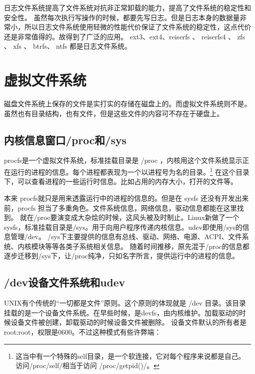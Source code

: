 日志文件系统提高了文件系统对抗非正常卸载的能力，提高了文件系统的稳定性和安全性。
虽然每次执行写操作的时候，都要先写日志。但是日志本身的数据量非常小，所以日志文件系统使用轻微的性能代价保证了文件系统的稳定性，这点代价还是非常值得的。故得到了广泛的应用。
ext3、ext4、reiserfs 、 reiserfs4 、 zfs 、 xfs 、 btrfs、 ntfs 都是日志文件系统。

\section{虚拟文件系统}

磁盘文件系统上保存的文件是实打实的存储在磁盘上的。而虚拟文件系统则不是。虽然也有目录结构，也有文件，但是这些文件的内容可不存在于硬盘上。


\subsection{内核信息窗口/proc和/sys}

procfs是一个虚拟文件系统，标准挂载目录是 /proc ，内核用这个文件系统显示正在运行的进程的信息。每个进程都表现为一个以进程号为名的目录。\footnote{ 这当中有一个特殊的self目录，是一个软连接，它对每个程序来说都是自己。访问/proc/self/相当于访问 /proc/getpid()/。}
在这个目录下，可以查看进程的一些运行时信息。比如占用的内存大小，打开的文件等。

本来 procfs就只是用来透露运行中的进程的信息的。但是在 sysfs 还没有开发出来前，procfs 担当了多重角色。文件系统信息，网络信息，驱动信息都能在这里找到。
就在/proc要演变成大杂烩的时候，这风头被及时制止。Linux新做了一个sysfs，标准挂载目录是/sys。用于向用户程序传递内核信息。udev即使用/sys的信息管理/dev。
/sys下主要提供的信息有总线、驱动、网络、电源、ACPI、文件系统、内核模块等等各类子系统相关信息。
随着时间推移，原先混于/proc的信息都逐步迁移到/sys下，让/proc纯净，只如名字所言，提供运行中的进程的信息。

\subsection{/dev设备文件系统和udev}

UNIX有个传统的“一切都是文件”原则。这个原则的体现就是 /dev 目录。该目录挂载的是一个设备文件系统。在早些时候，是devfs，由内核维护。加载驱动的时候设备文件被创建，卸载驱动的时候设备文件被删除。
设备文件默认的所有者是root:root，权限是0600。不过这种模式有些许弊端：

